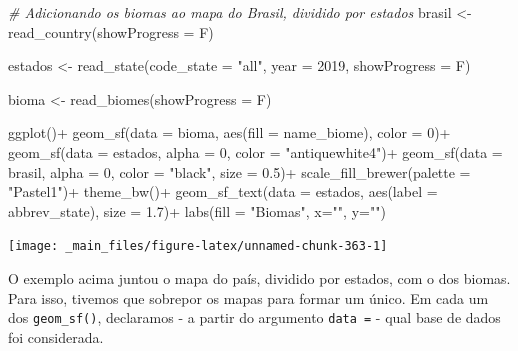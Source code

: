 \documentclass[
  brazilian,
]{book}
\newenvironment{Shaded}{\begin{snugshade}}{\end{snugshade}}
\newcommand{\AttributeTok}[1]{\textcolor[rgb]{0.77,0.63,0.00}{#1}}
\newcommand{\CommentTok}[1]{\textcolor[rgb]{0.56,0.35,0.01}{\textit{#1}}}
\newcommand{\DecValTok}[1]{\textcolor[rgb]{0.00,0.00,0.81}{#1}}
\newcommand{\FloatTok}[1]{\textcolor[rgb]{0.00,0.00,0.81}{#1}}
\newcommand{\FunctionTok}[1]{\textcolor[rgb]{0.00,0.00,0.00}{#1}}
\newcommand{\NormalTok}[1]{#1}
\newcommand{\OtherTok}[1]{\textcolor[rgb]{0.56,0.35,0.01}{#1}}
\newcommand{\SpecialCharTok}[1]{\textcolor[rgb]{0.00,0.00,0.00}{#1}}
\newcommand{\StringTok}[1]{\textcolor[rgb]{0.31,0.60,0.02}{#1}}
\begin{document}
\begin{Shaded}
\begin{Highlighting}[]
\CommentTok{\# Adicionando os biomas ao mapa do Brasil, dividido por estados}
\NormalTok{brasil }\OtherTok{\textless{}{-}} \FunctionTok{read\_country}\NormalTok{(}\AttributeTok{showProgress =}\NormalTok{ F)}

\NormalTok{estados }\OtherTok{\textless{}{-}} \FunctionTok{read\_state}\NormalTok{(}\AttributeTok{code\_state =} \StringTok{"all"}\NormalTok{,}
                      \AttributeTok{year =} \DecValTok{2019}\NormalTok{,}
                      \AttributeTok{showProgress =}\NormalTok{ F)}

\NormalTok{bioma }\OtherTok{\textless{}{-}} \FunctionTok{read\_biomes}\NormalTok{(}\AttributeTok{showProgress =}\NormalTok{ F)}

\FunctionTok{ggplot}\NormalTok{()}\SpecialCharTok{+}
  \FunctionTok{geom\_sf}\NormalTok{(}\AttributeTok{data =}\NormalTok{ bioma, }\FunctionTok{aes}\NormalTok{(}\AttributeTok{fill =}\NormalTok{ name\_biome), }\AttributeTok{color =} \DecValTok{0}\NormalTok{)}\SpecialCharTok{+}
  \FunctionTok{geom\_sf}\NormalTok{(}\AttributeTok{data =}\NormalTok{ estados, }\AttributeTok{alpha =} \DecValTok{0}\NormalTok{, }\AttributeTok{color =} \StringTok{"antiquewhite4"}\NormalTok{)}\SpecialCharTok{+}
  \FunctionTok{geom\_sf}\NormalTok{(}\AttributeTok{data =}\NormalTok{ brasil, }\AttributeTok{alpha =} \DecValTok{0}\NormalTok{, }\AttributeTok{color =} \StringTok{"black"}\NormalTok{, }\AttributeTok{size =} \FloatTok{0.5}\NormalTok{)}\SpecialCharTok{+}
  \FunctionTok{scale\_fill\_brewer}\NormalTok{(}\AttributeTok{palette =} \StringTok{"Pastel1"}\NormalTok{)}\SpecialCharTok{+}
  \FunctionTok{theme\_bw}\NormalTok{()}\SpecialCharTok{+}
  \FunctionTok{geom\_sf\_text}\NormalTok{(}\AttributeTok{data =}\NormalTok{ estados, }\FunctionTok{aes}\NormalTok{(}\AttributeTok{label =}\NormalTok{ abbrev\_state), }\AttributeTok{size =} \FloatTok{1.7}\NormalTok{)}\SpecialCharTok{+}
  \FunctionTok{labs}\NormalTok{(}\AttributeTok{fill =} \StringTok{"Biomas"}\NormalTok{, }\AttributeTok{x=}\StringTok{""}\NormalTok{, }\AttributeTok{y=}\StringTok{""}\NormalTok{)}
\end{Highlighting}
\end{Shaded}

\begin{center}\texttt{[image: \_main\_files/figure-latex/unnamed-chunk-363-1]} \end{center}

O exemplo acima juntou o mapa do país, dividido por estados, com o dos biomas. Para isso, tivemos que sobrepor os mapas para formar um único. Em cada um dos \texttt{geom\_sf()}, declaramos - a partir do argumento \texttt{data\ =} - qual base de dados foi considerada.
\end{document}
